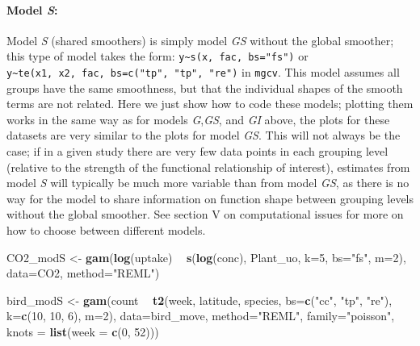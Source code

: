 \documentclass[12pt]{article}
\newenvironment{Shaded}{\begin{snugshade}}{\end{snugshade}}
\newcommand{\KeywordTok}[1]{\textcolor[rgb]{0.13,0.29,0.53}{\textbf{#1}}}
\newcommand{\DataTypeTok}[1]{\textcolor[rgb]{0.13,0.29,0.53}{#1}}
\newcommand{\DecValTok}[1]{\textcolor[rgb]{0.00,0.00,0.81}{#1}}
\newcommand{\StringTok}[1]{\textcolor[rgb]{0.31,0.60,0.02}{#1}}
\newcommand{\OperatorTok}[1]{\textcolor[rgb]{0.81,0.36,0.00}{\textbf{#1}}}
\newcommand{\NormalTok}[1]{#1}
\let\oldparagraph\paragraph
\renewcommand{\paragraph}[1]{\oldparagraph{#1}\mbox{}}
\begin{document}
\paragraph{\texorpdfstring{Model \emph{S}:}{Model S:}}\label{model-s}

Model \emph{S} (shared smoothers) is simply model \emph{GS} without the
global smoother; this type of model takes the form:
\texttt{y\textasciitilde{}s(x,\ fac,\ bs="fs")} or
\texttt{y\textasciitilde{}te(x1,\ x2,\ fac,\ bs=c("tp",\ "tp",\ "re")}
in \texttt{mgcv}. This model assumes all groups have the same
smoothness, but that the individual shapes of the smooth terms are not
related. Here we just show how to code these models; plotting them works
in the same way as for models \emph{G},\emph{GS}, and \emph{GI} above,
the plots for these datasets are very similar to the plots for model
\emph{GS}. This will not always be the case; if in a given study there
are very few data points in each grouping level (relative to the
strength of the functional relationship of interest), estimates from
model \emph{S} will typically be much more variable than from model
\emph{GS}, as there is no way for the model to share information on
function shape between grouping levels without the global smoother. See
section V on computational issues for more on how to choose between
different models.

\begin{Shaded}
\begin{Highlighting}[]
\NormalTok{CO2_modS <-}\StringTok{ }\KeywordTok{gam}\NormalTok{(}\KeywordTok{log}\NormalTok{(uptake) }\OperatorTok{~}\StringTok{ }\KeywordTok{s}\NormalTok{(}\KeywordTok{log}\NormalTok{(conc), Plant_uo, }\DataTypeTok{k=}\DecValTok{5}\NormalTok{, }\DataTypeTok{bs=}\StringTok{"fs"}\NormalTok{, }\DataTypeTok{m=}\DecValTok{2}\NormalTok{),}
                \DataTypeTok{data=}\NormalTok{CO2, }\DataTypeTok{method=}\StringTok{"REML"}\NormalTok{)}

\NormalTok{bird_modS <-}\StringTok{ }\KeywordTok{gam}\NormalTok{(count }\OperatorTok{~}\StringTok{ }\KeywordTok{t2}\NormalTok{(week, latitude, species, }\DataTypeTok{bs=}\KeywordTok{c}\NormalTok{(}\StringTok{"cc"}\NormalTok{, }\StringTok{"tp"}\NormalTok{, }\StringTok{"re"}\NormalTok{),}
                            \DataTypeTok{k=}\KeywordTok{c}\NormalTok{(}\DecValTok{10}\NormalTok{, }\DecValTok{10}\NormalTok{, }\DecValTok{6}\NormalTok{), }\DataTypeTok{m=}\DecValTok{2}\NormalTok{),}
                 \DataTypeTok{data=}\NormalTok{bird_move, }\DataTypeTok{method=}\StringTok{"REML"}\NormalTok{, }\DataTypeTok{family=}\StringTok{"poisson"}\NormalTok{,}
                 \DataTypeTok{knots =} \KeywordTok{list}\NormalTok{(}\DataTypeTok{week =} \KeywordTok{c}\NormalTok{(}\DecValTok{0}\NormalTok{, }\DecValTok{52}\NormalTok{)))}
\end{Highlighting}
\end{Shaded}
\end{document}
